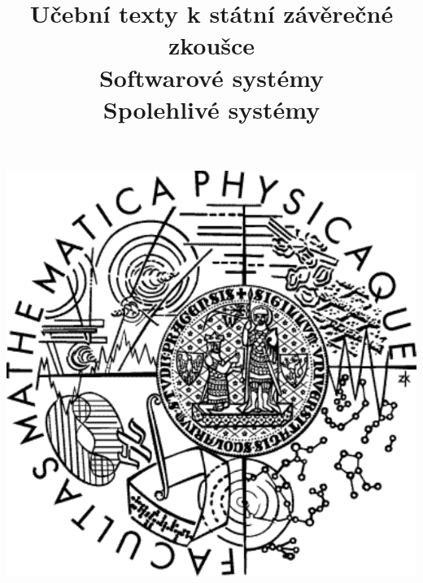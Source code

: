 \clearpage

\clearpage

\title{\LARGE Učební texty k státní závěrečné zkoušce \\ Softwarové systémy \\ Spolehlivé systémy}




\maketitle

\vspace{10mm}
\begin{center}
\includegraphics[scale=0.5]{../common/logo.pdf}
\end{center} 

\clearpage

\clearpage

\tableofcontents





